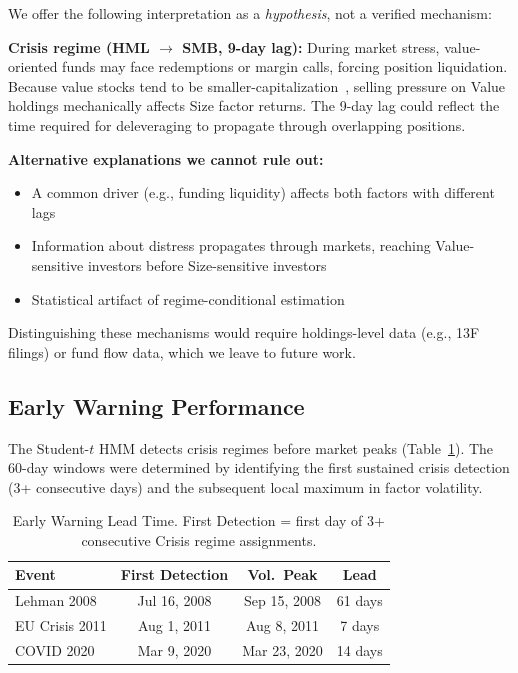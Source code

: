 \documentclass[sigconf]{acmart}
\begin{document}
We offer the following interpretation as a \emph{hypothesis}, not a verified mechanism:

\textbf{Crisis regime (HML $\to$ SMB, 9-day lag):} During market stress, value-oriented
funds may face redemptions or margin calls, forcing position liquidation. Because
value stocks tend to be smaller-capitalization~\cite{lou2022comomentum}, selling
pressure on Value holdings mechanically affects Size factor returns. The 9-day lag
could reflect the time required for deleveraging to propagate through overlapping
positions.

\textbf{Alternative explanations we cannot rule out:}
\begin{itemize}
    \item A common driver (e.g., funding liquidity) affects both factors with different lags
    \item Information about distress propagates through markets, reaching Value-sensitive
    investors before Size-sensitive investors
    \item Statistical artifact of regime-conditional estimation
\end{itemize}

Distinguishing these mechanisms would require holdings-level data (e.g., 13F filings)
or fund flow data, which we leave to future work.

\subsection{Early Warning Performance}
\label{sec:early_warning}

The Student-$t$ HMM detects crisis regimes before market peaks (Table~\ref{tab:warning}).
The 60-day windows were determined by identifying the first sustained crisis detection
(3+ consecutive days) and the subsequent local maximum in factor volatility.

\begin{table}[t]
\centering
\caption{Early Warning Lead Time. First Detection = first day of 3+ consecutive
Crisis regime assignments.}
\label{tab:warning}
\small
\begin{tabular}{@{}lccc@{}}
\toprule
Event & First Detection & Vol.\ Peak & Lead \\
\midrule
Lehman 2008 & Jul 16, 2008 & Sep 15, 2008 & 61 days \\
EU Crisis 2011 & Aug 1, 2011 & Aug 8, 2011 & 7 days \\
COVID 2020 & Mar 9, 2020 & Mar 23, 2020 & 14 days \\
\bottomrule
\end{tabular}
\end{table}
\end{document}
